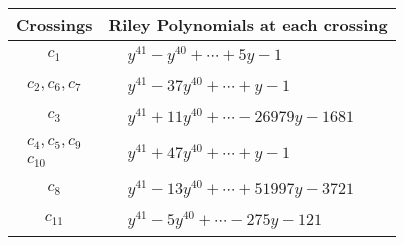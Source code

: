 \documentclass[1p]{elsarticle_modified}
\theoremstyle{definition}
\begin{document}
\begin{tabular}{m{50pt}|m{274pt}}
Crossings & \hspace{64pt}Riley Polynomials at each crossing \\
\hline $$\begin{aligned}c_{1}\end{aligned}$$&$\begin{aligned}
&y^{41}- y^{40}+\cdots+5 y-1
\end{aligned}$\\
\hline $$\begin{aligned}c_{2},c_{6},c_{7}\end{aligned}$$&$\begin{aligned}
&y^{41}-37 y^{40}+\cdots+y-1
\end{aligned}$\\
\hline $$\begin{aligned}c_{3}\end{aligned}$$&$\begin{aligned}
&y^{41}+11 y^{40}+\cdots-26979 y-1681
\end{aligned}$\\
\hline $$\begin{aligned}c_{4},c_{5},c_{9}\\c_{10}\end{aligned}$$&$\begin{aligned}
&y^{41}+47 y^{40}+\cdots+y-1
\end{aligned}$\\
\hline $$\begin{aligned}c_{8}\end{aligned}$$&$\begin{aligned}
&y^{41}-13 y^{40}+\cdots+51997 y-3721
\end{aligned}$\\
\hline $$\begin{aligned}c_{11}\end{aligned}$$&$\begin{aligned}
&y^{41}-5 y^{40}+\cdots-275 y-121
\end{aligned}$\\
\hline
\end{tabular}
\vskip 2pc
\end{document}
